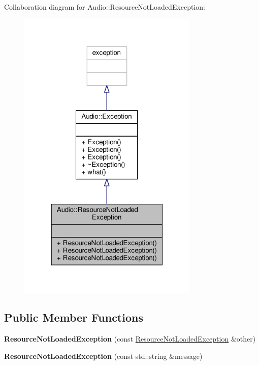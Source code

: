 Collaboration diagram for Audio\+:\+:Resource\+Not\+Loaded\+Exception\+:
\nopagebreak
\begin{figure}[H]
\begin{center}
\leavevmode
\includegraphics[width=244pt]{da/d89/classAudio_1_1ResourceNotLoadedException__coll__graph}
\end{center}
\end{figure}
\subsection*{Public Member Functions}
\begin{DoxyCompactItemize}
\item 
{\bfseries Resource\+Not\+Loaded\+Exception} (const \hyperlink{classAudio_1_1ResourceNotLoadedException}{Resource\+Not\+Loaded\+Exception} \&other)\hypertarget{classAudio_1_1ResourceNotLoadedException_a533255ab1c50662c26e978925b2c1f11}{}\label{classAudio_1_1ResourceNotLoadedException_a533255ab1c50662c26e978925b2c1f11}

\item 
{\bfseries Resource\+Not\+Loaded\+Exception} (const std\+::string \&message)\hypertarget{classAudio_1_1ResourceNotLoadedException_ace0c7a90e8788b8bc1af8102f4798e05}{}\label{classAudio_1_1ResourceNotLoadedException_ace0c7a90e8788b8bc1af8102f4798e05}

\end{DoxyCompactItemize}


